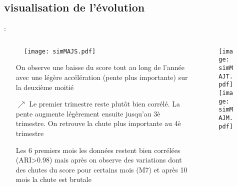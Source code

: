 \documentclass[8pt,aspectratio=169,hyperref={unicode=true}]{beamer}
\begin{document}
\subsection{visualisation de l'évolution}
\begin{frame}{\insertsection: \insertsubsection}
    \begin{columns}[t]
        \begin{column}{.5\textwidth}
            \begin{figure}
                \texttt{[image: simMAJS.pdf]}
            \end{figure}
            \begin{itemize}
                \footnotesize
                \item[\uparrow] On observe une baisse du score tout au long de l'année avec une légère accélération (pente plus importante) sur la deuxième moitié
                \item[$\nearrow$] Le premier trimestre reste plutôt bien corrélé. La pente augmente légèrement ensuite jusqu'au 3è trimestre. On retrouve la chute plus importante au 4è trimestre
                \item[\rightarrow] Les 6 premiers mois les données restent bien corrélées (ARI>0.98) mais après on observe des variations dont des chutes du score pour certains mois (M7) et après 10 mois la chute est brutale
            \end{itemize}
        \end{column}
        \begin{column}{.5\textwidth}
            \begin{figure}
                \texttt{[image: simMAJT.pdf]}
                \texttt{[image: simMAJM.pdf]}
            \end{figure}
        \end{column}
    \end{columns}
\end{frame}
\end{document}
